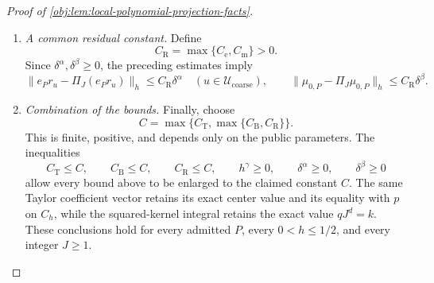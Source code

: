 \documentclass[11pt]{article}
\begin{document}
\begin{proof}[Proof of \cref{obj:lem:local-polynomial-projection-facts}]
\begin{enumerate}
Now set
\[
v^{(e,u,J)}_{\mathbf j,\kappa}
 =\frac{e_P(c_{\mathbf j})\mathsf A_{\mathbf j}[u,\kappa]}
        {\sqrt{J^d}},
\qquad
f_{e,u,J}(x)=
 \sum_{\mathbf j,\kappa}
 b_{\mathbf j,\kappa}(x)v^{(e,u,J)}_{\mathbf j,\kappa}.
\]
Disjointness of the cells and the tensor identity imply the everywhere
defined formula
\[
f_{e,u,J}(x)=
\begin{cases}
e_P(c_{\mathbf j})r_u(x),&x\in D_{\mathbf j},\\
0,&x\notin C_h.
\end{cases}
\]
Define
\[
E_{e,J}=L(\sqrt d)^\alpha4^d\delta^\alpha\ge0.
\]
For \(x\in D_{\mathbf j}\),
\[
\begin{aligned}
|f_{e,u}(x)-f_{e,u,J}(x)|
 &=|e_P(x)-e_P(c_{\mathbf j})|\,|r_u(x)|\\
 &\le L\|x-c_{\mathbf j}\|_2^\alpha4^d\\
 &\le L(\sqrt d\,\delta)^\alpha4^d
 =E_{e,J}.
\end{aligned}
\]
The probability normalization therefore gives
\[
\|f_{e,u}-f_{e,u,J}\|_h^2\le E_{e,J}^2.
\]
Applying the projection comparison from the preceding step to this
fine-basis expansion yields
\[
\|e_Pr_u-\Pi_J(e_Pr_u)\|_h
 \le\|f_{e,u}-f_{e,u,J}\|_h
 \le E_{e,J}.
\]
Thus the positive constant
\[
C_{\mathrm e}=L(\sqrt d)^\alpha4^d+1
\]
satisfies, uniformly in \(u\),
\[
\|e_Pr_u-\Pi_J(e_Pr_u)\|_h
 \le C_{\mathrm e}\delta^\alpha.
\]

\item \emph{A common residual constant.}
Define
\[
C_{\mathrm R}=\max\{C_{\mathrm e},C_{\mathrm m}\}>0.
\]
Since \(\delta^\alpha,\delta^\beta\ge0\), the preceding estimates imply
\[
\|e_Pr_u-\Pi_J(e_Pr_u)\|_h
 \le C_{\mathrm R}\delta^\alpha
 \quad(u\in\mathcal U_{\mathrm{coarse}}),
\qquad
\|\mu_{0,P}-\Pi_J\mu_{0,P}\|_h
 \le C_{\mathrm R}\delta^\beta.
\]

\item \emph{Combination of the bounds.}
Finally, choose
\[
C=\max\{C_{\mathrm T},\max\{C_{\mathrm B},C_{\mathrm R}\}\}.
\]
This is finite, positive, and depends only on the public parameters.
The inequalities
\[
C_{\mathrm T}\le C,\qquad
C_{\mathrm B}\le C,\qquad
C_{\mathrm R}\le C,
\qquad
h^\gamma\ge0,\qquad
\delta^\alpha\ge0,\qquad
\delta^\beta\ge0
\]
allow every bound above to be enlarged to the claimed constant \(C\).
The same Taylor coefficient vector retains its exact center value and
its equality with \(p\) on \(C_h\), while the squared-kernel integral
retains the exact value \(qJ^d=k\). These conclusions hold for every
admitted \(P\), every \(0<h\le1/2\), and every integer \(J\ge1\).
\end{enumerate}
\end{proof}
\end{document}
